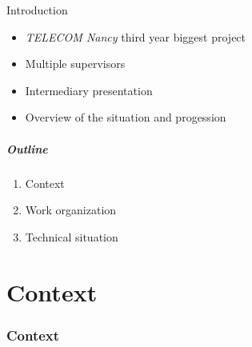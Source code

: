 \documentclass[12pt]{beamer}
\title{\titreA}
\subtitle{\titreB}
\author{Nicolas BOUGET, Julien GUÉPIN, Marc~PINHÈDE,~Julien~VAUBOURG}
\institute{TELECOM Nancy}
\date{December 20, 2012}
\begin{document}
\begin{frame}
\titlepage
\end{frame}

\begin{frame}{Introduction}
    \begin{itemize}[<+->]
	\item \emph{TELECOM Nancy} third year biggest project
	\vfill
	\item Multiple supervisors
	\vfill
	\item Intermediary presentation
	\vfill
	\item Overview of the situation and progession
    \end{itemize}
\end{frame}

\begin{frame}
    \frametitle{Outline}
    \begin{enumerate}
	\item \large{Context}
	\vfill
	\item \large{Work organization}
	\vfill
	\item \large{Technical situation}
    \end{enumerate}
\end{frame}



    
\part{Context}
\frame{\partpage}
\section{Context}
\end{document}
